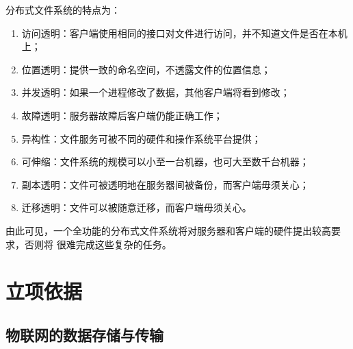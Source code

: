 \documentclass{ctexart}
\begin{document}
分布式文件系统的特点为：
\begin{enumerate}
\item 访问透明：客户端使用相同的接口对文件进行访问，并不知道文件是否在本机上；
\item 位置透明：提供一致的命名空间，不透露文件的位置信息；
\item 并发透明：如果一个进程修改了数据，其他客户端将看到修改；
\item 故障透明：服务器故障后客户端仍能正确工作；
\item 异构性：文件服务可被不同的硬件和操作系统平台提供；
\item 可伸缩：文件系统的规模可以小至一台机器，也可大至数千台机器；
\item 副本透明：文件可被透明地在服务器间被备份，而客户端毋须关心；
\item 迁移透明：文件可以被随意迁移，而客户端毋须关心。
\end{enumerate}

由此可见，一个全功能的分布式文件系统将对服务器和客户端的硬件提出较高要求，否则将
很难完成这些复杂的任务。

\section{立项依据}
\subsection{物联网的数据存储与传输}
\end{document}
